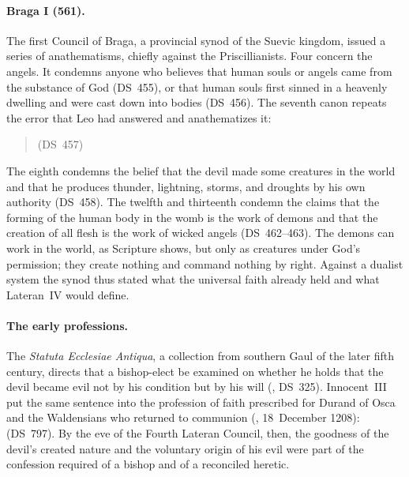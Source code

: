 \paragraph{Braga I (561).} The first Council of Braga, a provincial synod of
the Suevic kingdom, issued a series of anathematisms, chiefly against the
Priscillianists. Four concern the angels. It condemns anyone who believes
that human souls or angels came from the substance of God (DS~455), or that
human souls first sinned in a heavenly dwelling and were cast down into
bodies (DS~456). The seventh canon repeats the error that Leo had answered
and anathematizes it:
\begin{quote}
 (DS~457)
\end{quote}
The eighth condemns the belief that the devil made some creatures in the
world and that he produces thunder, lightning, storms, and droughts by his
own authority (DS~458). The twelfth and thirteenth condemn the claims that
the forming of the human body in the womb is the work of demons and that
the creation of all flesh is the work of wicked angels (DS~462--463). The
demons can work in the world, as Scripture shows, but only as creatures
under God's permission; they create nothing and command nothing by right.
Against a dualist system the synod thus stated what the universal faith
already held and what Lateran~IV would define.

\paragraph{The early professions.} The \emph{Statuta Ecclesiae Antiqua}, a
collection from southern Gaul of the later fifth century, directs that a
bishop-elect be examined on whether he holds that the devil became evil
not by his condition but by his will (, DS~325). Innocent~III
put the same sentence into the profession of faith prescribed for Durand of
Osca and the Waldensians who returned to communion (,
18~December 1208):  (DS~797). By the eve of the Fourth Lateran
Council, then, the goodness of the devil's created nature and the voluntary
origin of his evil were part of the confession required of a bishop and of
a reconciled heretic.

